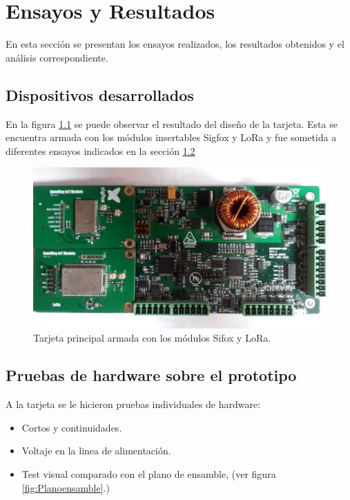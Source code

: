 
\chapter{Ensayos y Resultados} %

\label{Chapter4} %


En esta sección se presentan los ensayos realizados, los resultados obtenidos y el análisis correspondiente.

\section{Dispositivos desarrollados}
En la figura \ref{fig:MainBoaard} se puede observar el resultado del diseño de la tarjeta. Esta se encuentra armada con los módulos insertables Sigfox y LoRa y fue sometida a diferentes ensayos indicados en la sección \ref{sec:pruebasHW} 

\begin{figure}[H]
	\centering
	\includegraphics[scale=.45]{./Figures/MainBoardCompleta.jpeg}
	\caption{Tarjeta principal armada con los módulos Sifox y LoRa.}
	\label{fig:MainBoaard}
\end{figure}


\section{Pruebas de hardware sobre el prototipo} \label{sec:pruebasHW}
A la tarjeta se le hicieron pruebas individuales de hardware:
\begin{itemize}
    \item Cortos y continuidades.
    \item Voltaje en la linea de alimentación.
    \item Test visual comparado con el plano de ensamble, (ver figura
    \ref{fig:Planoensamble}.)
\end{itemize}

